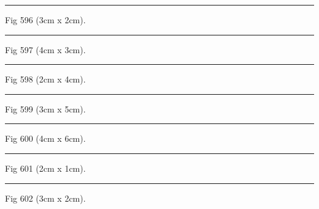 \documentclass[a4paper,11pt]{article}
\begin{document}
\begin{swarmwrap}%
  \begin{minipage}[t]{3cm}
    \centering
    \rule{\linewidth}{2cm}
    {\footnotesize Fig 596 (3cm x 2cm).}
  \end{minipage}%
\end{swarmwrap}%
\swarmwrapnext
\lipsum[146]%

\begin{swarmwrap}%
  \begin{minipage}[t]{4cm}
    \centering
    \rule{\linewidth}{3cm}
    {\footnotesize Fig 597 (4cm x 3cm).}
  \end{minipage}%
\end{swarmwrap}%
\swarmwrapnext
\lipsum[147]%

\begin{swarmwrap}%
  \begin{minipage}[t]{2cm}
    \centering
    \rule{\linewidth}{4cm}
    {\footnotesize Fig 598 (2cm x 4cm).}
  \end{minipage}%
\end{swarmwrap}%
\swarmwrapnext
\lipsum[148]%

\begin{swarmwrap}%
  \begin{minipage}[t]{3cm}
    \centering
    \rule{\linewidth}{5cm}
    {\footnotesize Fig 599 (3cm x 5cm).}
  \end{minipage}%
\end{swarmwrap}%
\swarmwrapnext
\lipsum[149]%

\begin{swarmwrap}%
  \begin{minipage}[t]{4cm}
    \centering
    \rule{\linewidth}{6cm}
    {\footnotesize Fig 600 (4cm x 6cm).}
  \end{minipage}%
\end{swarmwrap}%
\swarmwrapnext
\lipsum[150]%

\begin{swarmwrap}%
  \begin{minipage}[t]{2cm}
    \centering
    \rule{\linewidth}{1cm}
    {\footnotesize Fig 601 (2cm x 1cm).}
  \end{minipage}%
\end{swarmwrap}%
\swarmwrapnext
\lipsum[1]%

\begin{swarmwrap}%
  \begin{minipage}[t]{3cm}
    \centering
    \rule{\linewidth}{2cm}
    {\footnotesize Fig 602 (3cm x 2cm).}
  \end{minipage}%
\end{swarmwrap}%
\swarmwrapnext
\lipsum[2]%
\end{document}
